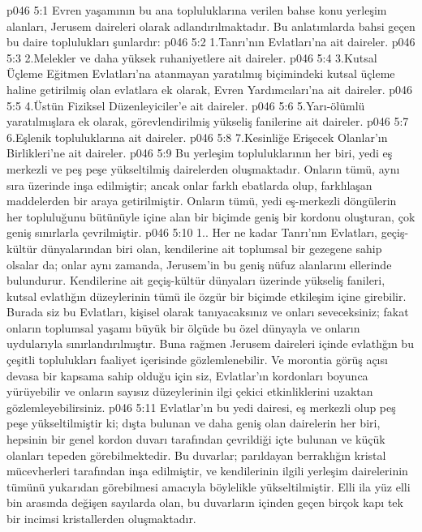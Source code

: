 \vs p046 5:1 Evren yaşamının bu ana topluluklarına verilen bahse konu yerleşim alanları, Jerusem daireleri olarak adlandırılmaktadır. Bu anlatımlarda bahsi geçen bu daire toplulukları şunlardır:
\vs p046 5:2 1.\bibnobreakspace Tanrı’nın Evlatları’na ait daireler.
\vs p046 5:3 2.\bibnobreakspace Melekler ve daha yüksek ruhaniyetlere ait daireler.
\vs p046 5:4 3.\bibnobreakspace Kutsal Üçleme Eğitmen Evlatları’na atanmayan yaratılmış biçimindeki kutsal üçleme haline getirilmiş olan evlatlara ek olarak, Evren Yardımcıları’na ait daireler.
\vs p046 5:5 4.\bibnobreakspace Üstün Fiziksel Düzenleyiciler’e ait daireler.
\vs p046 5:6 5.\bibnobreakspace Yarı\hyp{}ölümlü yaratılmışlara ek olarak, görevlendirilmiş yükseliş fanilerine ait daireler.
\vs p046 5:7 6.\bibnobreakspace Eşlenik topluluklarına ait daireler.
\vs p046 5:8 7.\bibnobreakspace Kesinliğe Erişecek Olanlar’ın Birlikleri’ne ait daireler.
\vs p046 5:9 Bu yerleşim topluluklarının her biri, yedi eş merkezli ve peş peşe yükseltilmiş dairelerden oluşmaktadır. Onların tümü, aynı sıra üzerinde inşa edilmiştir; ancak onlar farklı ebatlarda olup, farklılaşan maddelerden bir araya getirilmiştir. Onların tümü, yedi eş\hyp{}merkezli döngülerin her topluluğunu bütünüyle içine alan bir biçimde geniş bir kordonu oluşturan, çok geniş sınırlarla çevrilmiştir.
\vs p046 5:10 1.\bibnobreakspace {}. Her ne kadar Tanrı’nın Evlatları, geçiş\hyp{}kültür dünyalarından biri olan, kendilerine ait toplumsal bir gezegene sahip olsalar da; onlar aynı zamanda, Jerusem’in bu geniş nüfuz alanlarını ellerinde bulundurur. Kendilerine ait geçiş\hyp{}kültür dünyaları üzerinde yükseliş fanileri, kutsal evlatlığın düzeylerinin tümü ile özgür bir biçimde etkileşim içine girebilir. Burada siz bu Evlatları, kişisel olarak tanıyacaksınız ve onları seveceksiniz; fakat onların toplumsal yaşamı büyük bir ölçüde bu özel dünyayla ve onların uydularıyla sınırlandırılmıştır. Buna rağmen Jerusem daireleri içinde evlatlığın bu çeşitli toplulukları faaliyet içerisinde gözlemlenebilir. Ve morontia görüş açısı devasa bir kapsama sahip olduğu için siz, Evlatlar’ın kordonları boyunca yürüyebilir ve onların sayısız düzeylerinin ilgi çekici etkinliklerini uzaktan gözlemleyebilirsiniz.
\vs p046 5:11 Evlatlar’ın bu yedi dairesi, eş merkezli olup peş peşe yükseltilmiştir ki; dışta bulunan ve daha geniş olan dairelerin her biri, hepsinin bir genel kordon duvarı tarafından çevrildiği içte bulunan ve küçük olanları tepeden görebilmektedir. Bu duvarlar; parıldayan berraklığın kristal mücevherleri tarafından inşa edilmiştir, ve kendilerinin ilgili yerleşim dairelerinin tümünü yukarıdan görebilmesi amacıyla böylelikle yükseltilmiştir. Elli ila yüz elli bin arasında değişen sayılarda olan, bu duvarların içinden geçen birçok kapı tek bir incimsi kristallerden oluşmaktadır.
